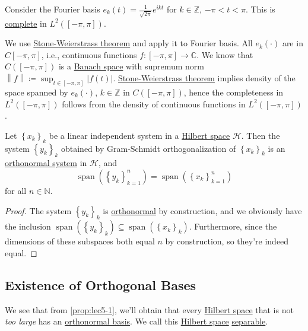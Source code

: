 \begin{eg}
	Consider the Fourier basis \(e_k (t) = \frac{1}{\sqrt{2\pi }} e^{ikt}\) for \(k\in \mathbb{Z } \), \(-\pi < t < \pi \). This is \hyperref[def:complete-system]{complete} in \(L^2([-\pi , \pi ])\).
\end{eg}
\begin{explanation}
	We use \href{https://en.wikipedia.org/wiki/Stone%E2%80%93Weierstrass_theorem}{Stone-Weierstrass theorem} and apply it to Fourier basis. All \(e_k(\cdot)\) are in \(C[-\pi , \pi ]\), i.e., continuous functions \(f\colon [-\pi , \pi ]\to \mathbb{C} \). We know that \(C([-\pi , \pi ])\) is a \hyperref[def:Banach-space]{Banach space} with supremum norm \(\left\lVert f\right\rVert \coloneqq \sup _{t\in [-\pi, \pi ]}\left\vert f(t) \right\vert\). \href{https://en.wikipedia.org/wiki/Stone%E2%80%93Weierstrass_theorem}{Stone-Weierstrass theorem} implies density of the space spanned by \(e_k(\cdot)\), \(k\in \mathbb{Z } \) in \(C([-\pi , \pi ])\), hence the completeness in \(L^2([-\pi , \pi ])\) follows from the density of continuous functions in \(L^2([-\pi , \pi ])\). 
\end{explanation}

\begin{proposition}\label{prop:lec5-1}
	Let \(\left\{ x_k \right\} _k\) be a linear independent system in a \hyperref[def:Hilbert-space]{Hilbert space} \(\mathcal{H} \). Then the system \(\left\{ y_k \right\} _k\) obtained by Gram-Schmidt orthogonalization of \(\left\{ x_k \right\} _k\) is an \hyperref[def:orthonormal-system]{orthonormal system} in \(\mathcal{H} \), and
	\[
		\mathop{\mathrm{span}}(\left\{ y_k \right\} _{k=1}^n) = \mathop{\mathrm{span}}(\left\{ x_k \right\} _{k=1}^n)
	\]
	for all \(n\in \mathbb{N} \).
\end{proposition}
\begin{proof}
	The system \(\left\{ y_k \right\} _k\) is \hyperref[def:orthonormal-system]{orthonormal} by construction, and we obviously have the inclusion \(\mathop{\mathrm{span}}(\left\{ y_k \right\} _k) \subseteq \mathop{\mathrm{span}}(\left\{ x_k \right\} _k)\). Furthermore, since the dimensions of these subspaces both equal \(n\) by construction, so they're indeed equal.
\end{proof}

\subsection{Existence of Orthogonal Bases}
We see that from \autoref{prop:lec5-1}, we'll obtain that every \hyperref[def:Hilbert-space]{Hilbert space} that is not \emph{too large} has an \hyperref[def:orthonormal-basis]{orthonormal basis}. We call this \hyperref[def:Hilbert-space]{Hilbert space} \hyperref[def:separable]{separable}.

